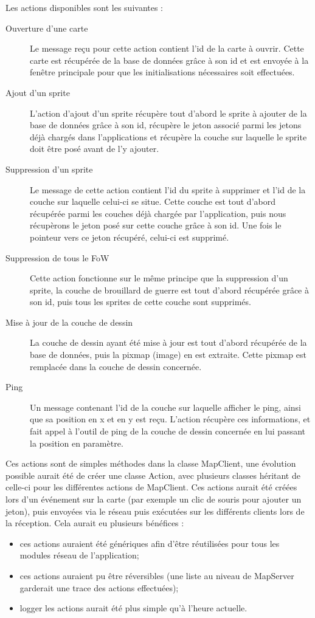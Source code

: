 Les actions disponibles sont les suivantes :
\begin{description}
	\item[Ouverture d'une carte] Le message reçu pour cette action contient l'id de la carte à ouvrir. Cette carte est récupérée de la base de données grâce à son id et est envoyée à la fenêtre principale pour que les initialisations nécessaires soit effectuées.
	\item[Ajout d'un sprite] L'action d'ajout d'un sprite récupère tout d'abord le sprite à ajouter de la base de données grâce à son id, récupère le jeton associé parmi les jetons déjà chargés dans l'applications et récupère la couche sur laquelle le sprite doit être posé avant de l'y ajouter.
	\item[Suppression d'un sprite] Le message de cette action contient l'id du sprite à supprimer et l'id de la couche sur laquelle celui-ci se situe. Cette couche est tout d'abord récupérée parmi les couches déjà chargée par l'application, puis nous récupèrons le jeton posé sur cette couche grâce à son id. Une fois le pointeur vers ce jeton récupéré, celui-ci est supprimé.
	\item[Suppression de tous le FoW] Cette action fonctionne sur le même principe que la suppression d'un sprite, la couche de brouillard de guerre est tout d'abord récupérée grâce à son id, puis tous les sprites de cette couche sont supprimés.
	\item[Mise à jour de la couche de dessin] La couche de dessin ayant été mise à jour est tout d'abord récupérée de la base de données, puis la pixmap (image) en est extraite. Cette pixmap est remplacée dans la couche de dessin concernée.
	\item[Ping] Un message contenant l'id de la couche sur laquelle afficher le ping, ainsi que sa position en x et en y est reçu. L'action récupère ces informations, et fait appel à l'outil de ping de la couche de dessin concernée en lui passant la position en paramètre.
\end{description}
\bigskip

Ces actions sont de simples méthodes dans la classe MapClient, une évolution possible aurait été de créer une classe Action, avec plusieurs classes héritant de celle-ci pour les différentes actions de MapClient. Ces actions aurait été créées lors d'un événement sur la carte (par exemple un clic de souris pour ajouter un jeton), puis envoyées via le réseau puis exécutées sur les différents clients lors de la réception. Cela aurait eu plusieurs bénéfices : 
\begin{itemize}
	\item ces actions auraient été génériques afin d'être réutilisées pour tous les modules réseau de l'application;
	\item ces actions auraient pu être réversibles (une liste au niveau de MapServer garderait une trace des actions effectuées);
	\item logger les actions aurait été plus simple qu'à l'heure actuelle.
\end{itemize}
\bigskip

